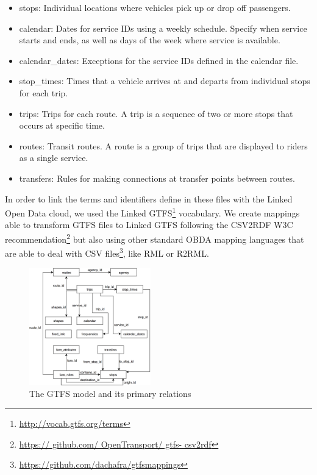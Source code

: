 \documentclass[sw]{iosart2x}
\begin{document}
\begin{itemize}
	\item stops: Individual locations where vehicles pick up or drop off passengers.
	\item calendar: Dates for service IDs using a weekly schedule. Specify when service starts and ends, as well as days of the week where service is available.
	\item calendar\_dates: Exceptions for the service IDs defined in the calendar file.
	\item stop\_times: Times that a vehicle arrives at and departs from individual stops for each trip.
	\item trips: Trips for each route. A trip is a sequence of two or more stops that occurs at specific time.
	\item routes: Transit routes. A route is a group of trips that are displayed to riders as a single service.
	\item transfers: Rules for making connections at transfer points between routes.
\end{itemize}

In order to link the terms and identifiers define in these files with the Linked Open Data cloud, we used the Linked GTFS\footnote{\url{http://vocab.gtfs.org/terms}} vocabulary. We create mappings able to transform GTFS files to Linked GTFS following the CSV2RDF\cite{tennison2015model} W3C recommendation\footnote{\url{https:// github.com/ OpenTransport/ gtfs- csv2rdf}} but also using other standard OBDA mapping languages that are able to deal with CSV files\footnote{\url{https://github.com/dachafra/gtfsmappings}}, like RML\cite{dimou2014rml} or R2RML\cite{das2012r2rml}. 

\begin{figure}[t]
	\includegraphics[width=0.47\textwidth]{images/gtfsmodel.png}
	\caption{The GTFS model and its primary relations}\label{fig:gtfs}
\end{figure}
\end{document}
